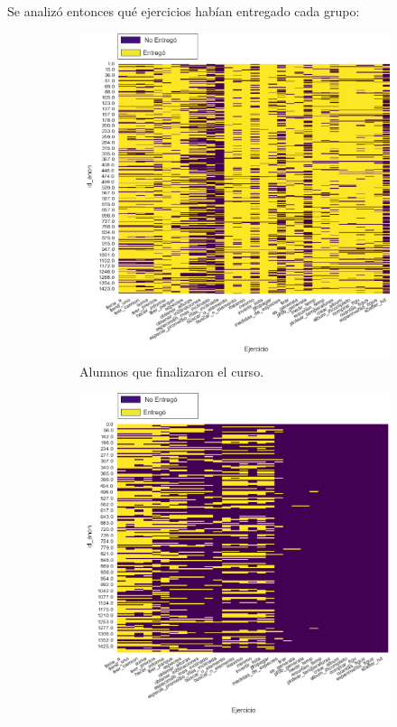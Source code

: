 \documentclass[11pt,a4paper,twoside,openany]{tesis}
\begin{document}
Se analizó entonces qué ejercicios habían entregado cada grupo: 
\begin{figure}[H]
    \centering
    \begin{subfigure}[t]{0.3\textwidth}
        \centering
        \includegraphics[width=\linewidth]{imagenes/entregas - finalizados.png}
        \caption{Alumnos que finalizaron el curso.}
        \label{fig:final}
    \end{subfigure}
    \hfill
    \begin{subfigure}[t]{0.3\textwidth}
        \centering
        \includegraphics[width=\linewidth]{imagenes/entregas - clique13.png}

\end{subfigure}
\end{figure}
\end{document}
